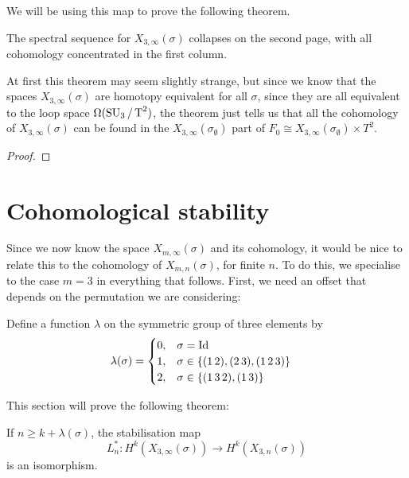 We will be using this map to prove the following theorem.
\begin{theorem}
  The spectral sequence for $X_{3,\infty}(\sigma)$ collapses on the
  second page, with all cohomology concentrated in the first column.
\end{theorem}
At first this theorem may seem slightly strange, but since we know
that the spaces $X_{3,\infty}(\sigma)$ are homotopy equivalent for all
$\sigma$, since they are all equivalent to the loop space
$\Omega(\operatorname{SU}_3/\operatorname{T}^2)$, the theorem
just tells us that all the cohomology of $X_{3,\infty}(\sigma)$ can be
found in the $X_{3,\infty}(\sigma_{\emptyset})$ part of $F_0 \cong
X_{3,\infty}(\sigma_{\emptyset})\times T^2$.

\begin{proof}
  
\end{proof}


\section{Cohomological stability}
\label{sec:costa}
Since we now know the space $X_{m,\infty}(\sigma)$ and its cohomology, it
would be nice to relate this to the cohomology of
$X_{m,n}(\sigma)$, for finite $n$. To do this, we specialise to the
case $m = 3$ in
everything that
follows. First, we need an offset that depends on the permutation
we are considering:
\begin{definition}
  Define a function $\lambda$ on the symmetric group of three elements
  by
  \begin{align*}
    \lambda(\sigma) &=
                      \begin{cases}
                        0, & \sigma = \operatorname{Id} \\
                        1, & \sigma \in \left\{ (1\,2),(2\,3),(1\,2\,3) \right\}
                        \\
                        2, & \sigma \in \left\{ (1\,3\,2), (1\,3) \right\}
                      \end{cases}
  \end{align*}
\end{definition}

This section will prove the following theorem:
\begin{theorem}
  \label{thm:kostab}
  If $n \geq k + \lambda(\sigma)$, the stabilisation map
  \[ L_{n}^* : H^k(X_{3,\infty}(\sigma)) \to H^k(X_{3,n}(\sigma)) \]
  is an isomorphism.
\end{theorem}


